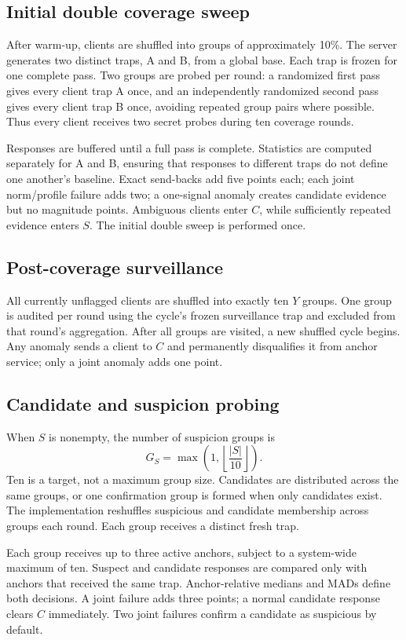 \subsection{Initial double coverage sweep}
After warm-up, clients are shuffled into groups of approximately 10\%. The server generates two distinct traps, A and B, from a global base. Each trap is frozen for one complete pass. Two groups are probed per round: a randomized first pass gives every client trap A once, and an independently randomized second pass gives every client trap B once, avoiding repeated group pairs where possible. Thus every client receives two secret probes during ten coverage rounds.

Responses are buffered until a full pass is complete. Statistics are computed separately for A and B, ensuring that responses to different traps do not define one another's baseline. Exact send-backs add five points each; each joint norm/profile failure adds two; a one-signal anomaly creates candidate evidence but no magnitude points. Ambiguous clients enter $C$, while sufficiently repeated evidence enters $S$. The initial double sweep is performed once.

\subsection{Post-coverage surveillance}
All currently unflagged clients are shuffled into exactly ten $Y$ groups. One group is audited per round using the cycle's frozen surveillance trap and excluded from that round's aggregation. After all groups are visited, a new shuffled cycle begins. Any anomaly sends a client to $C$ and permanently disqualifies it from anchor service; only a joint anomaly adds one point.

\subsection{Candidate and suspicion probing}
When $S$ is nonempty, the number of suspicion groups is
\begin{equation}
G_S=\max\left(1,\left\lfloor\frac{|S|}{10}\right\rfloor\right).
\end{equation}
Ten is a target, not a maximum group size. Candidates are distributed across the same groups, or one confirmation group is formed when only candidates exist. The implementation reshuffles suspicious and candidate membership across groups each round. Each group receives a distinct fresh trap.

Each group receives up to three active anchors, subject to a system-wide maximum of ten. Suspect and candidate responses are compared only with anchors that received the same trap. Anchor-relative medians and MADs define both decisions. A joint failure adds three points; a normal candidate response clears $C$ immediately. Two joint failures confirm a candidate as suspicious by default.


